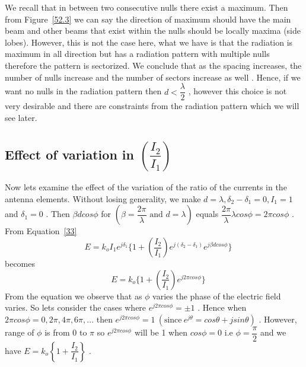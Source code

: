 We recall that in between two consecutive nulls there exist a maximum. Then from Figure~\ref{52.3} we can say the direction of maximum should have the main beam and other beams that exist within the nulls should be locally maxima (side lobes). However, this is not the case here, what we have is that the radiation is maximum in all direction but has a radiation pattern with multiple nulls therefore the pattern is sectorized. We conclude that as the spacing increases, the number of nulls increase and the number of sectors increase as well . Hence, if we want no nulls in the radiation pattern then $ d < \dfrac{\lambda}{2} $ , however this choice is not very desirable and there are constraints from the radiation pattern which we will see later.

\subsection{Effect of variation in $ \left( \dfrac{I_2}{I_1} \right) $ } 
Now lets examine the effect of the variation of the ratio of the currents in the antenna elements. Without losing generality, we make $ d = \lambda ,  \delta_2 - \delta_1 = 0 , I_1 =1 $ and $\delta_1 = 0 $ . Then $ \beta dcos\phi $ for $ ( \beta = \dfrac{2 \pi}{\lambda} \text{ and }  d = \lambda) $ equals $ \dfrac{2 \pi}{ \lambda } \lambda cos \phi = 2 \pi cos \phi $ . From Equation~\ref{33}
$$
\quad  E = k_o I_1 e^{j \delta_1} \{1 + \left( \dfrac{I_2}{I_1}\right) e^{j( \delta_2 - \delta_1)} e^{j \beta dcos\phi}\} 
$$
becomes
\begin{equation}
\quad E = k_o \{ 1 +  \left(\dfrac{I_2}{I_1}\right) e^{j 2 \pi cos\phi}  \}
\end{equation}
From the equation we observe that as $ \phi $ varies  the phase of the electric field varies. So lets consider the cases where $ e^{j 2 \pi cos\phi} = \pm 1 $ . Hence when $ 2 \pi cos\phi = 0, 2 \pi, 4 \pi, 6 \pi, ... $ then  $ e^{j 2 \pi cos\phi} = 1\ (\text{since}\ e^{j \theta} = cos\theta + j sin\theta) $ . However, range of $ \phi $ is from 0 to $ \pi $ so $ e^{j 2 \pi cos\phi} $ will be 1 when $ cos\phi = 0 $ i.e $ \phi = \dfrac{ \pi }{ 2 } $ and we have $ E  = k_o \left\{ 1 + \dfrac{I_2}{I_1} \right\} $ .
